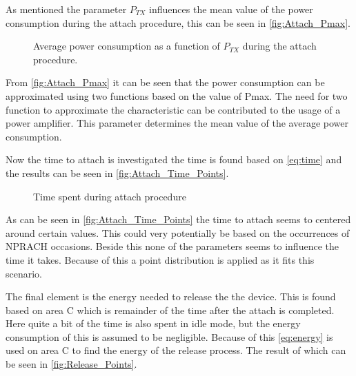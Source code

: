 As mentioned the parameter $P_{TX}$ influences the mean value of the power consumption during the attach procedure, this can be seen in \autoref{fig:Attach_Pmax}. 

\begin{figure}[H]
\centering
{}
\resizebox{0.7\textwidth}{!}{
}
\caption{Average power consumption as a function of $P_{TX}$ during the attach procedure.}
\label{fig:Attach_Pmax}
\end{figure}

From \autoref{fig:Attach_Pmax} it can be seen that the power consumption can be approximated using two functions based on the value of Pmax. The need for two function to approximate the characteristic can be contributed to the usage of a power amplifier. This parameter determines the mean value of the average power consumption. 

Now the time to attach is investigated the time is found based on \autoref{eq:time} and the results can be seen in \autoref{fig:Attach_Time_Points}.


\begin{figure}[H]
\centering
\begin{minipage}{0.48\textwidth}
\resizebox{\textwidth}{!}{
}
\end{minipage}
\hfill
\begin{minipage}{0.48\textwidth}
\resizebox{\textwidth}{!}{
}
\end{minipage}
\caption{Time spent during attach procedure}
\label{fig:Attach_Time_Points}
\end{figure}

As can be seen in \autoref{fig:Attach_Time_Points} the time to attach seems to centered around certain values. This could very potentially be based on the occurrences of NPRACH occasions. Beside this none of the parameters seems to influence the time it takes. Because of this a point distribution is applied as it fits this scenario. 

The final element is the energy needed to release the the device. This is found based on area C which is remainder of the time after the attach is completed. Here quite a bit of the time is also spent in idle mode, but the energy consumption of this is assumed to be negligible. Because of this \autoref{eq:energy} is used on area C to find the energy of the release process. The result of which can be seen in \autoref{fig:Release_Points}.

